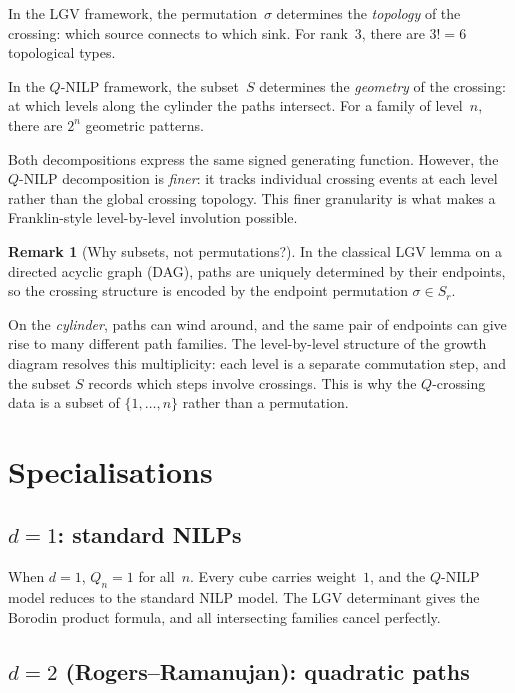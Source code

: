 \documentclass[11pt]{article}
\theoremstyle{plain}
\theoremstyle{definition}
\newtheorem{remark}[theorem]{Remark}
\begin{document}
In the LGV framework, the permutation~$\sigma$ determines the
\emph{topology} of the crossing: which source connects to which
sink.  For rank~$3$, there are $3! = 6$ topological types.

In the $Q$-NILP framework, the subset~$S$ determines the
\emph{geometry} of the crossing: at which levels along the cylinder
the paths intersect.  For a family of level~$n$, there are $2^n$
geometric patterns.

Both decompositions express the same signed generating function.
However, the $Q$-NILP decomposition is \emph{finer}: it tracks
individual crossing events at each level rather than the global
crossing topology.  This finer granularity is what makes a
Franklin-style level-by-level involution possible.

\begin{remark}[Why subsets, not permutations?]
\label{rem:why-subsets}
In the classical LGV lemma on a directed acyclic graph (DAG), paths
are uniquely determined by their endpoints, so the crossing structure
is encoded by the endpoint permutation $\sigma \in S_r$.

On the \emph{cylinder}, paths can wind around, and the same pair
of endpoints can give rise to many different path families.  The
level-by-level structure of the growth diagram resolves this
multiplicity: each level is a separate commutation step, and the
subset $S$ records which steps involve crossings.  This is why the
$Q$-crossing data is a subset of $\{1, \ldots, n\}$
rather than a permutation.
\end{remark}


\section{Specialisations}
\label{sec:special}


\subsection{$d = 1$: standard NILPs}

When $d = 1$, $Q_n = 1$ for all~$n$.  Every cube carries
weight~$1$, and the $Q$-NILP model reduces to the standard
NILP model.  The LGV determinant gives the Borodin product
formula, and all intersecting families cancel perfectly.


\subsection{$d = 2$ (Rogers--Ramanujan): quadratic paths}
\end{document}
